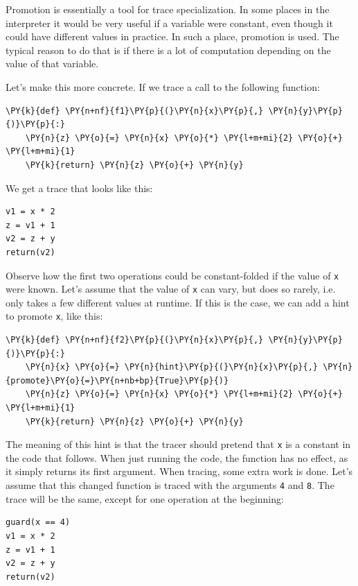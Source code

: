 \documentclass{sig-alternate}
\begin{document}
Promotion is essentially a tool for trace specialization. In some places in the
interpreter it would be very useful if a variable were constant, even though it
could have different values in practice. In such a place, promotion is used. The
typical reason to do that is if there is
a lot of computation depending on the value of that variable.

Let's make this more concrete. If we trace a call to the following function:
\begin{Verbatim}[commandchars=\\\{\}]
\PY{k}{def} \PY{n+nf}{f1}\PY{p}{(}\PY{n}{x}\PY{p}{,} \PY{n}{y}\PY{p}{)}\PY{p}{:}
    \PY{n}{z} \PY{o}{=} \PY{n}{x} \PY{o}{*} \PY{l+m+mi}{2} \PY{o}{+} \PY{l+m+mi}{1}
    \PY{k}{return} \PY{n}{z} \PY{o}{+} \PY{n}{y}
\end{Verbatim}

We get a trace that looks like this:

\begin{Verbatim}
v1 = x * 2
z = v1 + 1
v2 = z + y
return(v2)
\end{Verbatim}

Observe how the first two operations could be constant-folded if the value of
\texttt{x} were known. Let's assume that the value of \texttt{x} can vary, but does so
rarely, i.e. only takes a few different values at runtime. If this is the
case, we can add a hint to promote \texttt{x}, like this:
\begin{Verbatim}[commandchars=\\\{\}]
\PY{k}{def} \PY{n+nf}{f2}\PY{p}{(}\PY{n}{x}\PY{p}{,} \PY{n}{y}\PY{p}{)}\PY{p}{:}
    \PY{n}{x} \PY{o}{=} \PY{n}{hint}\PY{p}{(}\PY{n}{x}\PY{p}{,} \PY{n}{promote}\PY{o}{=}\PY{n+nb+bp}{True}\PY{p}{)}
    \PY{n}{z} \PY{o}{=} \PY{n}{x} \PY{o}{*} \PY{l+m+mi}{2} \PY{o}{+} \PY{l+m+mi}{1}
    \PY{k}{return} \PY{n}{z} \PY{o}{+} \PY{n}{y}
\end{Verbatim}

The meaning of this hint is that the tracer should pretend that \texttt{x} is a
constant
in the code that follows. When just running the code, the function has no
effect, as it simply returns its first argument. When tracing, some extra work
is done. Let's assume that this changed function is traced with
the arguments \texttt{4} and \texttt{8}. The trace will be the same, except for one
operation at the beginning:

\begin{Verbatim}
guard(x == 4)
v1 = x * 2
z = v1 + 1
v2 = z + y
return(v2)
\end{Verbatim}
\end{document}
